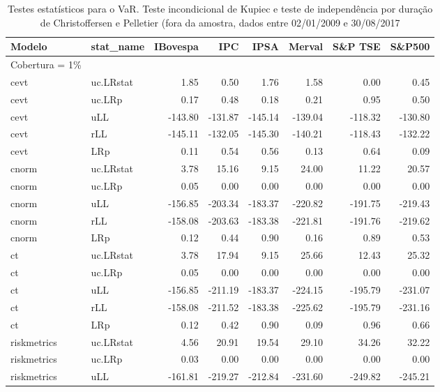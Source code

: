 \begin{longtable}{llrrrrrr}
\caption{Testes estatísticos para o VaR. Teste incondicional de Kupiec e teste de
             independência por duração de Christoffersen e Pelletier (fora da amostra, 
             dados entre 02/01/2009 e 30/08/2017} \\ 
  \hline
Modelo & stat\_name & IBovespa & IPC & IPSA & Merval & S\&P TSE & S\&P500 \\ 
  \hline
Cobertura = 1\% &  &  &  &  &  &  &  \\ 
  cevt & uc.LRstat & 1.85 & 0.50 & 1.76 & 1.58 & 0.00 & 0.45 \\ 
  cevt & uc.LRp & 0.17 & 0.48 & 0.18 & 0.21 & 0.95 & 0.50 \\ 
  cevt & uLL & -143.80 & -131.87 & -145.14 & -139.04 & -118.32 & -130.80 \\ 
  cevt & rLL & -145.11 & -132.05 & -145.30 & -140.21 & -118.43 & -132.22 \\ 
  cevt & LRp & 0.11 & 0.54 & 0.56 & 0.13 & 0.64 & 0.09 \\ 
  cnorm & uc.LRstat & 3.78 & 15.16 & 9.15 & 24.00 & 11.22 & 20.57 \\ 
  cnorm & uc.LRp & 0.05 & 0.00 & 0.00 & 0.00 & 0.00 & 0.00 \\ 
  cnorm & uLL & -156.85 & -203.34 & -183.37 & -220.82 & -191.75 & -219.43 \\ 
  cnorm & rLL & -158.08 & -203.63 & -183.38 & -221.81 & -191.76 & -219.62 \\ 
  cnorm & LRp & 0.12 & 0.44 & 0.90 & 0.16 & 0.89 & 0.53 \\ 
  ct & uc.LRstat & 3.78 & 17.94 & 9.15 & 25.66 & 12.43 & 25.32 \\ 
  ct & uc.LRp & 0.05 & 0.00 & 0.00 & 0.00 & 0.00 & 0.00 \\ 
  ct & uLL & -156.85 & -211.19 & -183.37 & -224.15 & -195.79 & -231.07 \\ 
  ct & rLL & -158.08 & -211.52 & -183.38 & -225.62 & -195.79 & -231.16 \\ 
  ct & LRp & 0.12 & 0.42 & 0.90 & 0.09 & 0.96 & 0.66 \\ 
  riskmetrics & uc.LRstat & 4.56 & 20.91 & 19.54 & 29.10 & 34.26 & 32.22 \\ 
  riskmetrics & uc.LRp & 0.03 & 0.00 & 0.00 & 0.00 & 0.00 & 0.00 \\ 
  riskmetrics & uLL & -161.81 & -219.27 & -212.84 & -231.60 & -249.82 & -245.21 \\ 

\end{longtable}

